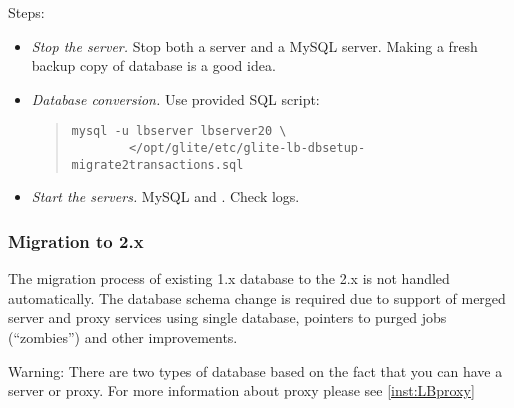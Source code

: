 Steps:
\begin{itemize}
 \item \emph{Stop the server.} Stop both a \LB server and a MySQL
 server. Making a fresh backup copy of database is a good idea.
 \item \emph{Database conversion.} Use provided SQL script:
  \begin{quote}
   \begin{verbatim}
mysql -u lbserver lbserver20 \
        </opt/glite/etc/glite-lb-dbsetup-migrate2transactions.sql
   \end{verbatim}
  \end{quote}
 \item \emph{Start the servers.} MySQL and \LB. Check logs.
\end{itemize}


\subsubsection{Migration to \LB 2.x}
\label{inst:migrate20}
The migration process of existing \LB 1.x database to the \LB 2.x is
not handled automatically. The database schema change is required due
to support of merged \LB server and proxy services using single
database, pointers to purged jobs (``zombies'') and other
improvements.

Warning: There are two types of \LB database based on the fact that
you can have a \LB server or \LB proxy. For more information about \LB
proxy please see \ref{inst:LBproxy}

